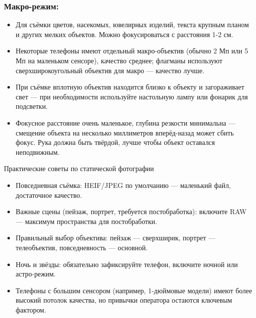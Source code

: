 \subsubsection*{Макро-режим:}

\begin{itemize}
  \item Для съёмки цветов, насекомых, ювелирных изделий, текста крупным планом и других мелких объектов. Можно фокусироваться с расстояния 1-2 см.
  \item Некоторые телефоны имеют отдельный макро-объектив (обычно 2 Мп или 5 Мп на маленьком сенсоре), качество среднее; флагманы используют сверхширокоугольный объектив для макро — качество лучше.
  \item При съёмке вплотную объектив находится близко к объекту и загораживает свет — при необходимости используйте настольную лампу или фонарик для подсветки.
  \item Фокусное расстояние очень маленькое, глубина резкости минимальна — смещение объекта на несколько миллиметров вперёд-назад может сбить фокус. Рука должна быть твёрдой, лучше чтобы объект оставался неподвижным.
\end{itemize}

\begin{tcbinfo}{Практические советы по статической фотографии}
\begin{itemize}
  \item Повседневная съёмка: HEIF/JPEG по умолчанию — маленький файл, достаточное качество.
  \item Важные сцены (пейзаж, портрет, требуется постобработка): включите RAW — максимум пространства для постобработки.
  \item Правильный выбор объектива: пейзаж — сверхширик, портрет — телеобъектив, повседневность — основной.
  \item Ночь и звёзды: обязательно зафиксируйте телефон, включите ночной или астро-режим.
  \item Телефоны с большим сенсором (например, 1-дюймовые модели) имеют более высокий потолок качества, но привычки оператора остаются ключевым фактором.
\end{itemize}

\end{tcbinfo}

